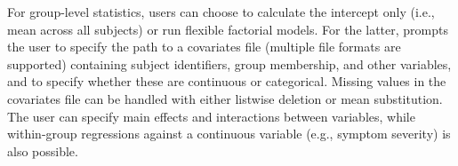 For group-level statistics, users can choose to calculate the intercept
only (i.e., mean across all subjects) or run flexible factorial models. For
the latter,  prompts the user to specify the path to a
covariates file (multiple file formats are supported) containing subject
identifiers, group membership, and other variables, and to specify whether
these are continuous or categorical. Missing values in the covariates file
can be handled with either listwise deletion or mean substitution. The user
can specify main effects and interactions between variables, while
within-group regressions against a continuous variable (e.g., symptom
severity) is also possible.
